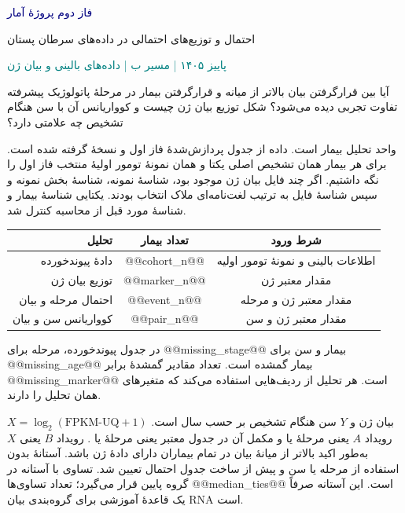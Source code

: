 \documentclass[11pt,a4paper]{article}
\newcommand{\reporttitle}[1]{\par\vspace{.7em}{\Large\textcolor{navy}{#1}}\par\vspace{.4em}}
\newcommand{\num}[1]{\lr{#1}}
\begin{document}
{\LARGE\textcolor{navy}{فاز دوم پروژهٔ آمار}}\par
{\large احتمال و توزیع‌های احتمالی در داده‌های سرطان پستان}\par
\textcolor{teal}{پاییز ۱۴۰۵ | مسیر ب | داده‌های بالینی و بیان ژن}

\reporttitle{۱. سؤال و فضای نمونه}
آیا بین قرارگرفتن بیان  بالاتر از میانه و قرارگرفتن بیمار در مرحلهٔ پاتولوژیک پیشرفته تفاوت تجربی دیده می‌شود؟ شکل توزیع بیان ژن چیست و کوواریانس آن با سن هنگام تشخیص چه علامتی دارد؟

واحد تحلیل بیمار است. داده از جدول پردازش‌شدهٔ فاز اول و نسخهٔ  گرفته شده است. برای هر بیمار همان تشخیص اصلی یکتا و همان نمونهٔ تومور اولیهٔ منتخب فاز اول را نگه داشتیم. اگر چند فایل بیان ژن موجود بود، شناسهٔ نمونه، شناسهٔ بخش نمونه و سپس شناسهٔ فایل به ترتیب لغت‌نامه‌ای ملاک انتخاب بودند. یکتایی شناسهٔ بیمار و شناسهٔ مورد قبل از محاسبه کنترل شد.

\begin{center}
\begin{tabular}{rcc}
\toprule
تحلیل & تعداد بیمار & شرط ورود \\
\midrule
دادهٔ پیوندخورده & @@cohort_n@@ & اطلاعات بالینی و نمونهٔ تومور اولیه \\
توزیع بیان ژن & @@marker_n@@ & مقدار معتبر ژن \\
احتمال مرحله و بیان & @@event_n@@ & مقدار معتبر ژن و مرحله \\
کوواریانس سن و بیان & @@pair_n@@ & مقدار معتبر ژن و سن \\
\bottomrule
\end{tabular}
\end{center}

در جدول پیوندخورده، مرحله برای @@missing_stage@@ بیمار و سن برای @@missing_age@@ بیمار گمشده است. تعداد مقادیر گمشدهٔ  برابر @@missing_marker@@ است. هر تحلیل از ردیف‌هایی استفاده می‌کند که متغیرهای همان تحلیل را دارند.

\reporttitle{۲. رویدادها و متغیرهای تصادفی}
\(X=\log_2(\text{FPKM-UQ}+1)\) بیان ژن و \(Y\) سن هنگام تشخیص بر حسب سال است. رویداد \(A\) یعنی مرحلهٔ  یا  و مکمل آن در جدول معتبر یعنی مرحلهٔ  یا . رویداد \(B\) یعنی \(X\) به‌طور اکید بالاتر از میانهٔ بیان در تمام بیماران دارای دادهٔ ژن باشد. آستانهٔ \num{@@median@@} بدون استفاده از مرحله یا سن و پیش از ساخت جدول احتمال تعیین شد. تساوی با آستانه در گروه پایین قرار می‌گیرد؛ تعداد تساوی‌ها @@median_ties@@ است. این آستانه صرفاً یک قاعدهٔ آموزشی برای گروه‌بندی بیان RNA است.
\end{document}

